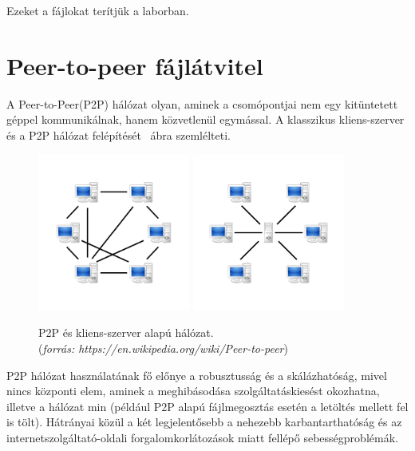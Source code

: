 Ezeket a fájlokat terítjük a laborban.
\section{Peer-to-peer fájlátvitel} 
\label{sect:p2p}
A Peer-to-Peer(P2P) hálózat olyan, aminek a csomópontjai nem egy kitüntetett géppel 
kommunikálnak, hanem közvetlenül egymással. A klasszikus kliens-szerver és a P2P hálózat felépítését
~ábra szemlélteti.

\begin{figure}[ht]
	\centering
	\includegraphics[width=50mm, keepaspectratio]{figures/P2P-network.png}\hspace{1cm}
	\includegraphics[width=50mm, keepaspectratio]{figures/Server-based-network.png}
	\caption{P2P és kliens-szerver alapú hálózat. \\(\textit{forrás: https://en.wikipedia.org/wiki/Peer-to-peer})}
	\label{fig:networkcomparison}
\end{figure}

P2P hálózat használatának fő előnye a robusztusság és a skálázhatóság, mivel nincs központi elem,
aminek a meghibásodása szolgáltatáskiesést okozhatna, illetve a hálózat min (például P2P alapú fájlmegosztás esetén a letöltés mellett fel is tölt). Hátrányai közül a két legjelentősebb a nehezebb karbantarthatóság és az internetszolgáltató-oldali forgalomkorlátozások miatt fellépő sebességproblémák.

